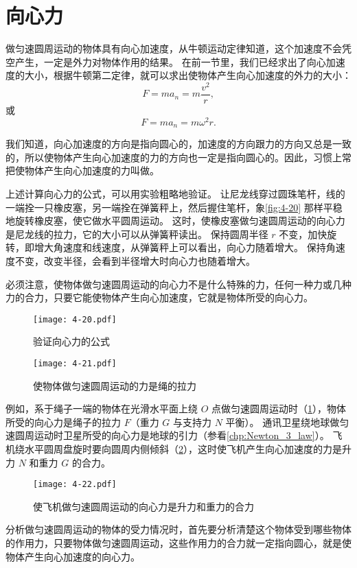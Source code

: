 \section{向心力}
做匀速圆周运动的物体具有向心加速度，从牛顿运动定律知道，这个加速度不会凭空产生，一定是外力对物体作用的结果。
在前一节里，我们已经求出了向心加速度的大小，根据牛顿第二定律，就可以求出使物体产生向心加速度的外力的大小：
\[F=ma_n=m\frac{v^2}{r},\]
或
\[F=ma_n=m\omega^2 r.\]

我们知道，向心加速度的方向是指向圆心的，加速度的方向跟力的方向又总是一致的，所以使物体产生向心加速度的力的方向也一定是指向圆心的。因此，习惯上常把使物体产生向心加速度的力叫做。

上述计算向心力的公式，可以用实验粗略地验证。
让尼龙线穿过圆珠笔杆，线的一端拴一只橡皮塞，另一端拴在弹簧秤上，然后握住笔杆，象\cref{fig:4-20} 那样平稳地旋转橡皮塞，使它做水平圆周运动。
这时，使橡皮塞做匀速圆周运动的向心力是尼龙线的拉力，它的大小可以从弹簧秤读出。
保持圆周半径 $r$ 不变，加快旋转，即增大角速度和线速度，从弹簧秤上可以看出，向心力随着增大。
保持角速度不变，改变半径，会看到半径增大时向心力也随着增大。

必须注意，使物体做匀速圆周运动的向心力不是什么特殊的力，任何一种力或几种力的合力，只要它能使物体产生向心加速度，它就是物体所受的向心力。

\begin{figure}\centering
  \begin{minipage}[b]{0.4\linewidth}\centering
    \texttt{[image: 4-20.pdf]}
    \caption{验证向心力的公式}\label{fig:4-20}
  \end{minipage}
  \begin{minipage}[b]{0.58\linewidth}\centering
    \texttt{[image: 4-21.pdf]}
    \caption{使物体做匀速圆周运动的力是绳的拉力}\label{fig:4-21}
  \end{minipage}
\end{figure}

例如，系于绳子一端的物体在光滑水平面上绕 $O$ 点做匀速圆周运动时（\cref{fig:4-21}），物体所受的向心力是绳子的拉力 $F$（重力 $G$ 与支持力 $N$ 平衡）。
通讯卫星绕地球做匀速圆周运动时卫星所受的向心力是地球的引力（参看\cref{chp:Newton_3_law}）。 
飞机绕水平圆周盘旋时要向圆周内侧倾斜（\cref{fig:4-22}），这时使飞机产生向心加速度的力是升力 $N$ 和重力 $G$ 的合力。
\begin{figure}
  \texttt{[image: 4-22.pdf]}
  \caption{使飞机做匀速圆周运动的向心力是升力和重力的合力}\label{fig:4-22}
\end{figure}

分析做匀速圆周运动的物体的受力情况时，首先要分析清楚这个物体受到哪些物体的作用力，只要物体做匀速圆周运动，这些作用力的合力就一定指向圆心，就是使物体产生向心加速度的向心力。

